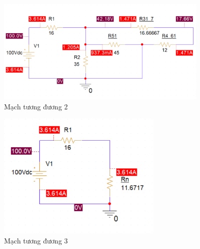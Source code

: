     \begin{figure}[!htbp]
            \centering
            \includegraphics[width=0.9\textwidth]{graphics/ex10/f4.png}
            \caption{Mạch tương đương 2}
    \end{figure}

    \begin{figure}[!htbp]
                \centering
                \includegraphics[width=0.7\textwidth]{graphics/ex10/f9.png}
                \caption{Mạch tương đương 3}
    \end{figure}
